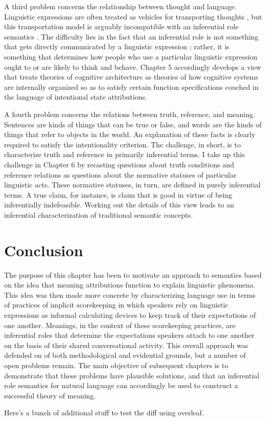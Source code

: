 A third problem concerns the relationship between thought and language. Linguistic expressions are often treated as vehicles for transporting thoughts \citep{Brandom:1994,KortaPerry:2015,Fodor:1998}, but this transportation model is arguably incompatible with an inferential role semantics \citep{Brandom:2010,Brandom:1994}. The difficulty lies in the fact that an inferential role is not something that gets directly communicated by a linguistic expression \citep{Brandom:2010,Brandom:1994}; rather, it is something that determines how people who use a particular linguistic expression ought to or are likely to think and behave. Chapter 5 accordingly develops a view that treats theories of cognitive architecture as theories of how cognitive systems are internally organized so as to satisfy certain function specifications couched in the language of intentional state attributions. 

A fourth problem concerns the relations between truth, reference, and meaning. Sentences are kinds of things that can be true or false, and words are the kinds of things that refer to objects in the world. An explanation of these facts is clearly required to satisfy the intentionality criterion. The challenge, in short, is to characterize truth and reference in primarily inferential terms. I take up this challenge in Chapter 6 by recasting questions about truth conditions and reference relations as questions about the normative statuses of particular linguistic acts. These normative statuses, in turn, are defined in purely inferential terms. A true claim, for instance, is claim that is good in virtue of being inferentially indefeasible. Working out the details of this view leads to an inferential characterization of traditional semantic concepts.

\section{Conclusion}

The purpose of this chapter has been to motivate an approach to semantics based on the idea that meaning attributions function to explain linguistic phenomena. This idea was then made more concrete by characterizing language use in terms of practices of implicit scorekeeping in which speakers rely on linguistic expressions as informal calculating devices to keep track of their expectations of one another. Meanings, in the context of these scorekeeping practices, are inferential roles that determine the expectations speakers attach to one another on the basis of their shared conversational activity. This overall approach was defended on of both methodological and evidential grounds, but a number of open problems remain. The main objective of subsequent chapters is to demonstrate that these problems have plausible solutions, and that an inferential role semantics for natural language can accordingly be used to construct a successful theory of meaning. 

Here's a bunch of additional stuff to test the diff using overleaf. 



